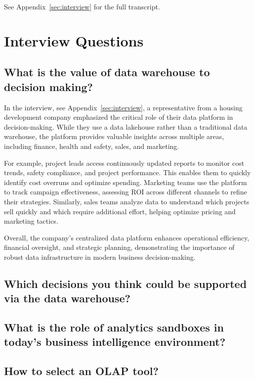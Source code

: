 See Appendix~\ref{sec:interview} for the full transcript.
\section{Interview Questions}

\subsection{What is the value of data warehouse to decision making?}

In the interview, see Appendix~\ref{sec:interview}, a representative from a housing development company emphasized the critical role of their data platform 
in decision-making. While they use a data lakehouse rather than a traditional data warehouse, the platform provides valuable 
insights across multiple areas, including finance, health and safety, sales, and marketing.

For example, project leads access continuously updated reports to monitor cost trends, safety compliance, and project performance. 
This enables them to quickly identify cost overruns and optimize spending. Marketing teams use the platform to track campaign 
effectiveness, assessing ROI across different channels to refine their strategies. Similarly, sales teams analyze data to understand 
which projects sell quickly and which require additional effort, helping optimize pricing and marketing tactics.

Overall, the company's centralized data platform enhances operational efficiency, financial oversight, and strategic planning, 
demonstrating the importance of robust data infrastructure in modern business decision-making.

\subsection{Which decisions you think could be supported via the data warehouse?}

\subsection{What is the role of analytics sandboxes in today’s business intelligence environment?} 

\subsection{How to select an OLAP tool?}
